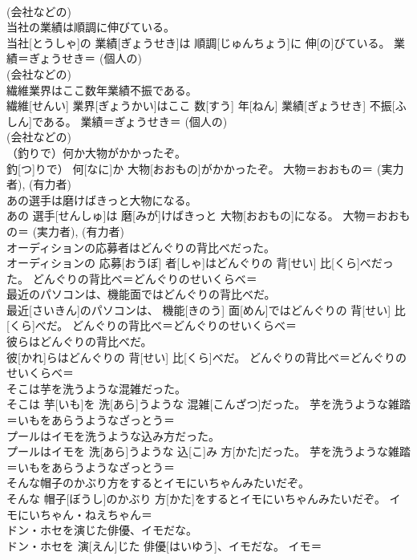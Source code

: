 \documentclass[8pt]{extreport}
\begin{document}
\begin{CJK}{UTF8}{min}
{\\	(会社などの) 
\\	当社の業績は順調に伸びている。	
\\	当社[とうしゃ]の 業績[ぎょうせき]は 順調[じゅんちょう]に 伸[の]びている。	業績＝ぎょうせき＝ (個人の) 
\\	(会社などの) 
\\	繊維業界はここ数年業績不振である。	
\\	繊維[せんい] 業界[ぎょうかい]はここ 数[すう] 年[ねん] 業績[ぎょうせき] 不振[ふしん]である。	業績＝ぎょうせき＝ (個人の) 
\\	(会社などの) 
\\	（釣りで）何か大物がかかったぞ。	
\\	釣[つ]りで） 何[なに]か 大物[おおもの]がかかったぞ。	大物＝おおもの＝ (実力者), (有力者) 
\\	あの選手は磨けばきっと大物になる。	
\\	あの 選手[せんしゅ]は 磨[みが]けばきっと 大物[おおもの]になる。	大物＝おおもの＝ (実力者), (有力者) 
\\	オーディションの応募者はどんぐりの背比べだった。	
\\	オーディションの 応募[おうぼ] 者[しゃ]はどんぐりの 背[せい] 比[くら]べだった。	どんぐりの背比べ＝どんぐりのせいくらべ＝ 
\\	最近のパソコンは、機能面ではどんぐりの背比べだ。	
\\	最近[さいきん]のパソコンは、 機能[きのう] 面[めん]ではどんぐりの 背[せい] 比[くら]べだ。	どんぐりの背比べ＝どんぐりのせいくらべ＝ 
\\	彼らはどんぐりの背比べだ。	
\\	彼[かれ]らはどんぐりの 背[せい] 比[くら]べだ。	どんぐりの背比べ＝どんぐりのせいくらべ＝ 
\\	そこは芋を洗うような混雑だった。	
\\	そこは 芋[いも]を 洗[あら]うような 混雑[こんざつ]だった。	芋を洗うような雑踏＝いもをあらうようなざっとう＝ 
\\	プールはイモを洗うような込み方だった。	
\\	プールはイモを 洗[あら]うような 込[こ]み 方[かた]だった。	芋を洗うような雑踏＝いもをあらうようなざっとう＝ 
\\	そんな帽子のかぶり方をするとイモにいちゃんみたいだぞ。	
\\	そんな 帽子[ぼうし]のかぶり 方[かた]をするとイモにいちゃんみたいだぞ。	イモにいちゃん・ねえちゃん＝ 
\\	ドン・ホセを演じた俳優、イモだな。	
\\	ドン・ホセを 演[えん]じた 俳優[はいゆう]、イモだな。	イモ＝ 
}
\end{CJK}
\end{document}
